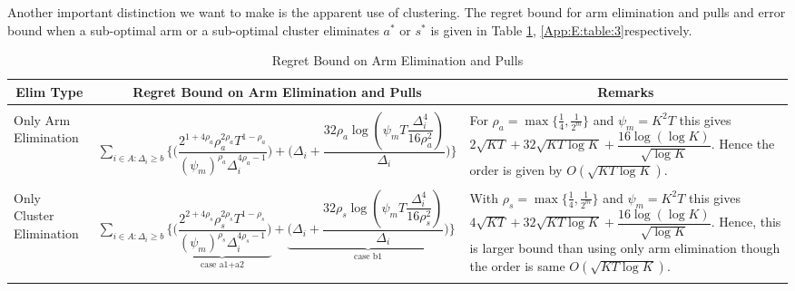 \begin{remark}
\label{App:E:Rem:1}
Another important distinction we want to make is the apparent use of clustering. The regret bound for arm elimination and pulls and error bound when a sub-optimal arm or a sub-optimal cluster eliminates $a^{*}$ or $s^{*}$ is given in Table \ref{App:E:table:2}, \ref{App:E:table:3}respectively.
 
\begin{table}
\caption{Regret Bound on Arm Elimination and Pulls}
\label{App:E:table:2}
\begin{center}
\begin{tabular}{p{1.4cm}p{10.2cm}p{3.5cm}}
\multicolumn{1}{c}{\bf Elim Type} &\multicolumn{1}{c}{\bf Regret Bound on Arm Elimination and Pulls} &\multicolumn{1}{c}{\bf Remarks} \\
\hline \\
Only Arm Elimination 	&$\sum_{i\in A:\Delta_{i}\geq b}\bigg\lbrace\bigg(\dfrac{2^{1+4\rho_{a}}\rho_{a}^{2\rho_{a}}T^{1-\rho_{a}}}{(\psi_{m})^{\rho_{a}}\Delta_{i}^{4\rho_{a}-1}}\bigg) + \bigg(\Delta_{i}+ \dfrac{32\rho_{a}\log{(\psi_{m}T\dfrac{\Delta_{i}^{4}}{16\rho_{a}^{2}})}}{\Delta_{i}}\bigg)\bigg\rbrace$ & For $\rho_{a}=\max\lbrace\frac{1}{4},\frac{1}{2^{m}}\rbrace$ and $\psi_{m}=K^{2}T$ this gives $ 2\sqrt{KT} + 32\sqrt{KT\log K} + \dfrac{16\log(\log K)}{\sqrt{\log K}}$. Hence the order is given by $O(\sqrt{KT\log K})$.\\
\hline\\
Only Cluster Elimination	&$ \sum_{i\in A:\Delta_{i}\geq b}\bigg\lbrace\underbrace{\bigg(\dfrac{2^{2+4\rho_{s}}\rho_{s}^{2\rho_{s}}T^{1-\rho_{s}}}{(\psi_{m})^{\rho_{s}}\Delta_{i}^{4\rho_{s}-1}}\bigg)}_{\text{case a1+a2}} +  \underbrace{\bigg(\Delta_{i} +\dfrac{32\rho_{s}\log{(\psi_{m}T\dfrac{\Delta_{i}^{4}}{16\rho_{s}^{2}})}}{\Delta_{i}}\bigg)}_{\text{case b1}}\bigg\rbrace$ & With $\rho_{s}=\max\lbrace\frac{1}{4},\frac{1}{2^{m}}\rbrace$ and  $\psi_{m}=K	^{2}T$ this gives $ 4\sqrt{KT} + 32\sqrt{KT\log K} + \dfrac{16\log(\log K)}{\sqrt{\log K}}$. Hence, this is larger bound than using only arm elimination though the order is same $O(\sqrt{KT\log K})$.\\
\hline\\

\end{tabular}
\end{center}
\end{table}
\end{remark}
